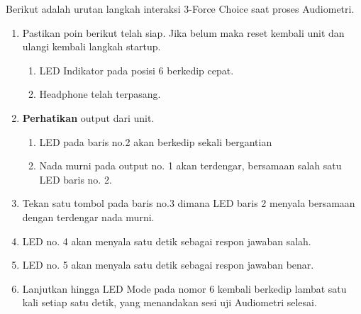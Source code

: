 \documentclass[12pt,]{article}
\begin{document}
	Berikut adalah urutan langkah interaksi 3-Force Choice saat proses Audiometri.
	\begin{enumerate}
		\item Pastikan poin berikut telah siap. Jika belum maka reset kembali unit
		dan ulangi kembali langkah startup.
		\begin{enumerate}
			\renewcommand{\theenumi}{\Alph{enumi}}
			
			\item LED Indikator pada posisi 6 berkedip cepat.
			\item Headphone telah terpasang.
		\end{enumerate}
		
		\item \textbf{Perhatikan} output dari unit.
		\begin{enumerate}
			\renewcommand{\theenumi}{\Alph{enumi}}
			
			\item LED pada baris no.2 akan berkedip sekali bergantian
			\item Nada murni pada output no. 1 akan terdengar,
			bersamaan salah satu LED baris no. 2.
		\end{enumerate}
		
		\item Tekan satu tombol pada baris no.3 dimana LED baris 2 menyala bersamaan dengan terdengar nada murni.
		
		\item LED no. 4 akan menyala satu detik sebagai respon jawaban salah.

		\item LED no. 5 akan menyala satu detik sebagai respon jawaban benar.
		
		\item Lanjutkan hingga LED Mode pada nomor 6 kembali berkedip lambat satu kali setiap satu detik, yang menandakan sesi uji Audiometri selesai.
	\end{enumerate}
	
\end{document}
